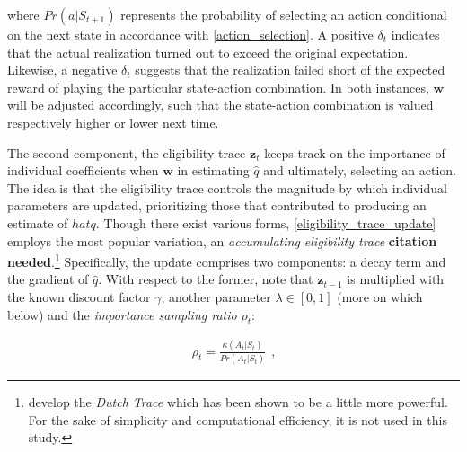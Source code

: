 where $Pr(a|S_{t+1})$ represents the probability of selecting an action conditional on the next state in accordance with \autoref{action_selection}. A positive $\delta_t$ indicates that the actual realization turned out to exceed the original expectation. Likewise, a negative $\delta_t$ suggests that the realization failed short of the expected reward of playing the particular state-action combination. In both instances, $\boldsymbol{w}$ will be adjusted accordingly, such that the state-action combination is valued respectively higher or lower next time.

The second component, the eligibility trace $\boldsymbol{z}_t$ keeps track on the importance of individual coefficients when $\boldsymbol{w}$ in estimating $\hat{q}$ and ultimately, selecting an action. The idea is that the eligibility trace controls the magnitude by which individual parameters are updated, prioritizing those that contributed to producing an estimate of $hat{q}$. Though there exist various forms, \autoref{eligibility_trace_update} employs the most popular variation, an \emph{accumulating eligibility trace} \textbf{citation needed}.\footnote{\textcite{seijen_true_2014} develop the \emph{Dutch Trace} which has been shown to be a little more powerful. For the sake of simplicity and computational efficiency, it is not used in this study.} Specifically, the update comprises two components: a decay term and the gradient of $\hat{q}$. With respect to the former, note that $\boldsymbol{z}_{t-1}$ is multiplied with the known discount factor $\gamma$, another parameter $\lambda \in [0,1]$ (more on which below) and the \emph{importance sampling ratio} $\rho_t$:

\begin{gather}
	 \rho_t = \frac{\kappa(A_t|S_{t})}{Pr(A_t|S_t)} ~~  \text{,}
\end{gather}

